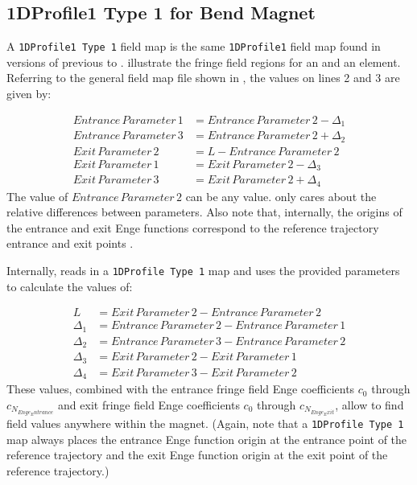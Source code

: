 
\subsection{1DProfile1 Type 1 for Bend Magnet}
\label{ssec:1DProfile1Type1}
A \texttt{1DProfile1 Type 1} field map is the same \texttt{1DProfile1} field map found in versions of \opal previous to
\opal {} .  illustrate the fringe field
regions for an  and an  element. Referring to the general field map file shown in
, the values on lines 2 and 3 are given by:

\begin{align*}
  Entrance\,Parameter\,1 &= Entrance\,Parameter\,2 - \Delta_{1} \\
  Entrance\,Parameter\,3 &= Entrance\,Parameter\,2 + \Delta_{2} \\
  Exit\,Parameter\,2 &= L - Entrance\,Parameter\,2 \\
  Exit\,Parameter\,1 &= Exit\,Parameter\,2 - \Delta_{3} \\
  Exit\,Parameter\,3 &= Exit\,Parameter\,2 + \Delta_{4}
\end{align*}
The value of $Entrance\,Parameter\,2$ can be any value. \opal only cares about the relative differences between
parameters. Also note that, internally, the origins of the entrance and exit Enge functions correspond to the
reference trajectory entrance and exit points .

Internally, \opal reads in a \texttt{1DProfile Type 1} map and uses the provided parameters to calculate the values of:

\begin{align*}
L &= Exit\,Parameter\,2 - Entrance\,Parameter\,2 \\
\Delta_{1} &= Entrance\,Parameter\,2 - Entrance\,Parameter\,1 \\
\Delta_{2} &= Entrance\,Parameter\,3 - Entrance\,Parameter\,2 \\
\Delta_{3} &= Exit\,Parameter\,2 - Exit\,Parameter\,1 \\
\Delta_{4} &= Exit\,Parameter\,3 - Exit\,Parameter\,2
\end{align*}
These values, combined with the entrance fringe field Enge coefficients $c_0$ through $c_{N_{Enge_Entrance}}$ and exit fringe field Enge coefficients $c_0$ through $c_{N_{Enge_Exit}}$, allow \opal to find field values anywhere within the magnet. (Again, note that a \texttt{1DProfile Type 1} map always places the entrance Enge function origin at the entrance point of the reference trajectory and the exit Enge function origin at the exit point of the reference trajectory.)

